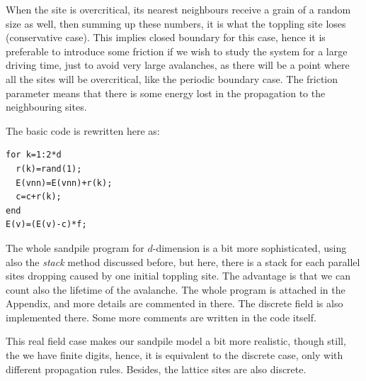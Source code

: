When the site is overcritical, its nearest neighbours receive a grain of a random size as well, then summing up these numbers, it is what the toppling site loses (conservative case).
This implies closed boundary for this case, hence it is preferable to introduce some friction if we wish to study the system for a large driving time, just to avoid very large avalanches,
as there will be a point where all the sites will be overcritical, like the periodic boundary case. 
The friction parameter means that there is some energy lost in the propagation to the neighbouring sites.

The basic code is rewritten here as:
\begin{lstlisting}
for k=1:2*d
  r(k)=rand(1);                    
  E(vnn)=E(vnn)+r(k); 
  c=c+r(k);
end        
E(v)=(E(v)-c)*f;
\end{lstlisting}


The whole sandpile program for $d$-dimension is a bit more sophisticated, using also the \emph{stack} method discussed before, 
but here, there is a stack for each parallel sites dropping caused by one initial toppling site. The advantage is that we can count also the lifetime of the avalanche. 
The whole program is attached in the Appendix, and more details are commented in there. The discrete field is also implemented there. 
Some more comments are written in the code itself.

This real field case makes our sandpile model a bit more realistic, though still, the we have finite digits, hence, it is equivalent to the discrete case, only with different propagation rules.
Besides, the lattice sites are also discrete.






